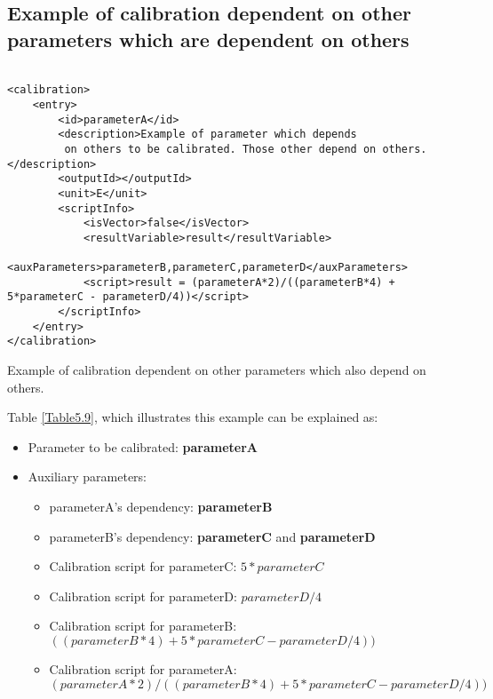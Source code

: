 \subsection{Example of calibration dependent on other parameters which are dependent on others}




 \begin{table}[H]
\lstset{language=XML}
\begin{lstlisting}

<calibration>
	<entry>
		<id>parameterA</id>
		<description>Example of parameter which depends
		 on others to be calibrated. Those other depend on others.</description>
		<outputId></outputId>
		<unit>E</unit>
		<scriptInfo>
			<isVector>false</isVector>
			<resultVariable>result</resultVariable>
			<auxParameters>parameterB,parameterC,parameterD</auxParameters>
			<script>result = (parameterA*2)/((parameterB*4) + 5*parameterC - parameterD/4))</script>
		</scriptInfo>
	</entry>
</calibration>
\end{lstlisting}
\caption{Example of calibration dependent on other parameters which also depend on others.} 
\label{Table5.9}
\end{table}

Table \ref{Table5.9}, which illustrates this example can be explained as:
\begin{itemize}
\item Parameter to be calibrated: \textbf{parameterA}
\item Auxiliary parameters:
	\begin{itemize}
		\item parameterA's dependency: \textbf{parameterB}
		\item parameterB's dependency: \textbf{parameterC} and \textbf{parameterD}
		\item Calibration script for parameterC: $5*parameterC$
		\item Calibration script for parameterD: $parameterD/4$
		\item Calibration script for parameterB: $((parameterB*4) + 5*parameterC - parameterD/4))$
		\item Calibration script for parameterA: $(parameterA*2)/((parameterB*4) + 5*parameterC - parameterD/4))$
	\end{itemize}
\end{itemize}



